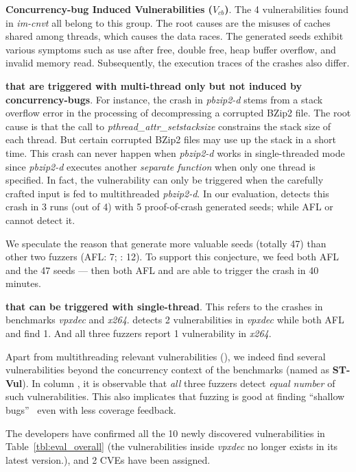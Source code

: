 \textbf{Concurrency-bug Induced Vulnerabilities ($V_{cb}$)}.
The 4 vulnerabilities found in \emph{im-cnvt} all belong to this group. The root causes are the misuses of caches shared among threads, which causes the data races. The generated seeds  exhibit various symptoms such as use after free, double free, heap buffer overflow, and 
invalid memory read. Subsequently, the execution traces of the crashes also differ.

\textbf{\textbf{{\vulsMT} that are triggered with multi-thread only but not induced by concurrency-bugs}}.
For instance, the crash in \emph{pbzip2-d} stems from a stack overflow error in the processing of decompressing a corrupted BZip2 file. The root cause is that the call to \emph{pthread\_attr\_setstacksize} constrains the 
stack size of each thread. But certain corrupted BZip2 files may use up the stack in a short
time. This crash can never happen when \emph{pbzip2-d} works in single-threaded mode since \emph{pbzip2-d} executes another \emph{separate function} when only one thread is specified.  In fact, the vulnerability can only be triggered when the carefully crafted input is fed to
multithreaded \emph{pbzip2-d}. In our evaluation, \mtfuzz detects this crash in 3 runs (out of 4) 
with 5 proof-of-crash generated seeds; while AFL or \mtfuzzc cannot detect it. 

We speculate the reason that \mtfuzz generate more valuable seeds (totally 47) than other two 
fuzzers (AFL: 7; \mtfuzzc: 12). To support this conjecture, we feed both AFL and \mtfuzzc the 47 
\mtfuzz seeds --- then both AFL and \mtfuzzc are able to trigger the crash in 40 minutes.


\textbf{{\vulsMT} that can be triggered with single-thread}. This refers to the crashes in benchmarks \emph{vpxdec} and \emph{x264}. 
\mtfuzz detects 2 vulnerabilities in \emph{vpxdec} while both AFL and \mtfuzzc find 1. And all three
fuzzers report 1 vulnerability in \emph{x264}.

Apart from multithreading relevant vulnerabilities (\vulsMT), we indeed find several vulnerabilities beyond the concurrency context of the benchmarks (named as \textbf{ST-Vul}). In column \vulsST, it is observable 
that \emph{all} three fuzzers detect \emph{equal number} of such vulnerabilities. 
This also implicates that fuzzing is good at finding ``shallow bugs''~\cite{driller} even with less coverage 
feedback.

The developers have confirmed all the 10 newly discovered vulnerabilities in Table~\ref{tbl:eval_overall} (the vulnerabilities inside \emph{vpxdec} no longer exists in its latest version.), 
and 2 CVEs have been assigned.


